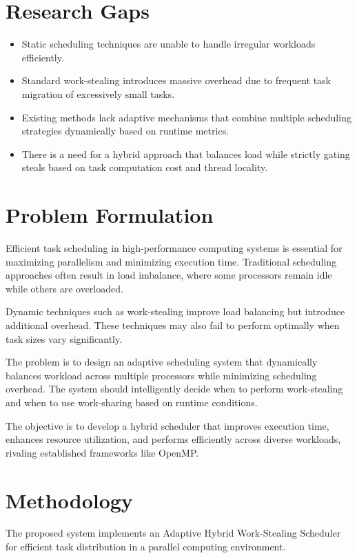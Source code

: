 \documentclass[12pt,a4paper]{article}
\begin{document}
\newpage
\section{Research Gaps}

\begin{itemize}
\item Static scheduling techniques are unable to handle irregular workloads efficiently.
\item Standard work-stealing introduces massive overhead due to frequent task migration of excessively small tasks.
\item Existing methods lack adaptive mechanisms that combine multiple scheduling strategies dynamically based on runtime metrics.
\item There is a need for a hybrid approach that balances load while strictly gating steals based on task computation cost and thread locality.
\end{itemize}

\section{Problem Formulation}

Efficient task scheduling in high-performance computing systems is essential for maximizing parallelism and minimizing execution time. Traditional scheduling approaches often result in load imbalance, where some processors remain idle while others are overloaded.

Dynamic techniques such as work-stealing improve load balancing but introduce additional overhead. These techniques may also fail to perform optimally when task sizes vary significantly.

The problem is to design an adaptive scheduling system that dynamically balances workload across multiple processors while minimizing scheduling overhead. The system should intelligently decide when to perform work-stealing and when to use work-sharing based on runtime conditions.

The objective is to develop a hybrid scheduler that improves execution time, enhances resource utilization, and performs efficiently across diverse workloads, rivaling established frameworks like OpenMP.

\newpage
\section{Methodology}

The proposed system implements an Adaptive Hybrid Work-Stealing Scheduler for efficient task distribution in a parallel computing environment.
\end{document}
